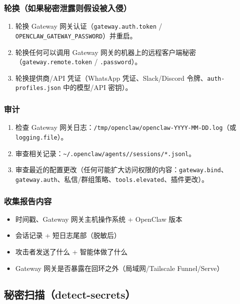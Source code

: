 \subsubsection{轮换（如果秘密泄露则假设被入侵）}


\begin{enumerate}
  \item 轮换 Gateway 网关认证（\texttt{gateway.auth.token} / \texttt{OPENCLAW\_GATEWAY\_PASSWORD}）并重启。
  \item 轮换任何可以调用 Gateway 网关的机器上的远程客户端秘密（\texttt{gateway.remote.token} / \texttt{.password}）。
  \item 轮换提供商/API 凭证（WhatsApp 凭证、Slack/Discord 令牌、\texttt{auth-profiles.json} 中的模型/API 密钥）。
\end{enumerate}


\subsubsection{审计}


\begin{enumerate}
  \item 检查 Gateway 网关日志：\texttt{/tmp/openclaw/openclaw-YYYY-MM-DD.log}（或 \texttt{logging.file}）。
  \item 审查相关记录：\texttt{\textasciitilde{}/.openclaw/agents//sessions/*.jsonl}。
  \item 审查最近的配置更改（任何可能扩大访问权限的内容：\texttt{gateway.bind}、\texttt{gateway.auth}、私信/群组策略、\texttt{tools.elevated}、插件更改）。
\end{enumerate}


\subsubsection{收集报告内容}


\begin{itemize}
  \item 时间戳、Gateway 网关主机操作系统 + OpenClaw 版本
  \item 会话记录 + 短日志尾部（脱敏后）
  \item 攻击者发送了什么 + 智能体做了什么
  \item Gateway 网关是否暴露在回环之外（局域网/Tailscale Funnel/Serve）
\end{itemize}


\subsection{秘密扫描（detect-secrets）}


